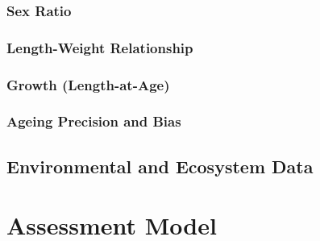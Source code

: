 \documentclass[11pt,
  english,
  a4paper,
]{article}
\begin{document}
\leavevmode\tagmcend\tagstructend


\hypertarget{sex-ratio}{%
\subsubsection{Sex Ratio}\label{sex-ratio}}

\leavevmode\tagmcend\tagstructend


\hypertarget{length-weight-relationship}{%
\subsubsection{Length-Weight Relationship}\label{length-weight-relationship}}

\leavevmode\tagmcend\tagstructend


\hypertarget{growth-length-at-age}{%
\subsubsection{Growth (Length-at-Age)}\label{growth-length-at-age}}

\leavevmode\tagmcend\tagstructend


\hypertarget{ageing-precision-and-bias}{%
\subsubsection{Ageing Precision and Bias}\label{ageing-precision-and-bias}}

\leavevmode\tagmcend\tagstructend


\hypertarget{environmental-and-ecosystem-data}{%
\subsection{Environmental and Ecosystem Data}\label{environmental-and-ecosystem-data}}

\leavevmode\tagmcend\tagstructend


\hypertarget{assessment-model}{%
\section{Assessment Model}\label{assessment-model}}
\end{document}
